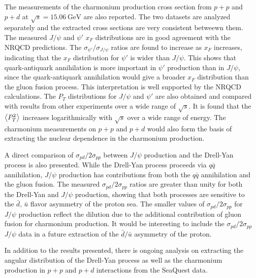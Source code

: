 \documentclass[../main.tex]{subfiles}
\begin{document}
The measurements of the charmonium production cross section from $p+p$
and $p+d$ at $\sqrt{s}=\SI{15.06}{\GeV}$ are also reported. The two datasets
are analyzed separately and the extracted cross sections are very consistent betweewn them.
The measured $J/\psi$ and $\psi'$ $x_F$ distributions are in good agreement with the NRQCD predictions.
The $\sigma_{\psi'}/\sigma_{J/\psi}$ ratios are found to increase as $x_F$ increases, indicating
that the $x_F$ distribution for $\psi'$ is wider than $J/\psi$.
This shows that quark-antiquark annihilation is more important in $\psi'$ production than in $J/\psi$,
since the quark-antiquark annihilation would give a broader $x_F$ distribution than the gluon fusion process.
This interpretation is well supported by the NRQCD calculations.
The $P_T$ distributions for $J/\psi$ and $\psi'$ are also obtained and compared with results from other experiments over a wide range of $\sqrt{s}$.
It is found that the $\expval{P_T^2}$ increases logarithmically with $\sqrt{s}$ over a wide range of energy.
The charmonium measurements on $p+p$ and $p+d$ would also form the basis of
extracting the nuclear dependence in the charmonium production.

A direct comparison of $\sigma_{pd}/2\sigma_{pp}$
between $J/\psi$ production and the Drell-Yan process is also presented. 
While the Drell-Yan process proceeds via $q \bar{q}$ annihilation,
$J/\psi$ production has contributions from both the $q \bar{q}$ annihilation and the gluon fusion.
The measured $\sigma_{pd}/2\sigma_{pp}$ ratios are greater than unity for both the Drell-Yan and $J/\psi$ production,
showing that both processes are sensitive to the $\bar{d},\,\bar{u}$ flavor asymmetry of the proton sea.
The smaller values of $\sigma_{pd}/2\sigma_{pp}$ for $J/\psi$
production reflect the dilution due to the additional contribution
of gluon fusion for charmonium production. 
It would be interesting to include the $\sigma_{pd}/2\sigma_{pp}$ $J/\psi$ data in a future
extraction of the $\bar{d}/ \bar{u}$ asymmetry of the proton. 

In addition to the results presented, there is ongoing analysis on extracting
the angular distribution of the Drell-Yan process as well as the charmonium
production in $p+p$ and $p+d$ interactions from the SeaQuest data.
\end{document}
